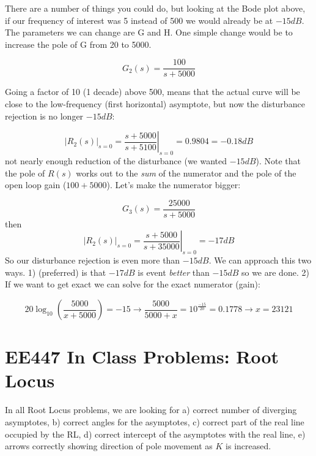 \documentclass{article}	%
\begin{document}
\begin{solution}
There are a number of things you could do, but looking at the Bode plot above, if our frequency of interest was 5 instead of 500 we would already be at $-15dB$.   The parameters we can change are G and H.  One simple change would be to increase the pole of G from 20 to 5000. 

\[
G_2(s) = \frac {100}{s+5000}
\]

    Going a factor of 10 (1 decade) above 500, means that the actual curve will be close to the low-frequency (first horizontal) asymptote, but now the disturbance rejection is no longer  $-15dB$:
    
\[
|R_2(s)|_{s=0} = \left . \frac{s+5000}{s+5100} \right |_{s=0} = 0.9804 = -0.18dB
\]
not nearly enough reduction of the disturbance (we wanted $-15dB$).  Note that the pole of $R(s)$ works out to the {\it sum} of the 
numerator and the pole of the open loop gain ($100 + 5000$).    Let's make the numerator bigger:
 
\[
G_3(s) = \frac {25000}{s+5000}
\]
then 
\[
|R_2(s)|_{s=0} = \left . \frac{s+5000}{s+35000} \right |_{s=0} = -17dB
\]
So our disturbance rejection is even more than $-15dB$.  We can approach this two ways. 1) (preferred) is that $-17dB$ is event {\it better} than $-15dB$ so we are done.  2) If we want to get exact we can solve for the exact numerator (gain):

\[
20 \log_{10}\left( \frac{5000}{x+5000} \right) = -15 \to  \frac{5000} {5000+x} = 10^{\frac{-15}{20}} = 0.1778 \to x = 23121
\]

\end{solution}







\newpage
\section{EE447 In Class Problems: Root Locus}

In all Root Locus problems, we are looking for a) correct number of diverging asymptotes, b) correct angles for the asymptotes, c) correct part of the real line occupied by the RL, d) correct intercept of the asymptotes with the real line, e) arrows correctly showing direction of pole movement as $K$ is increased.

\end{document}
